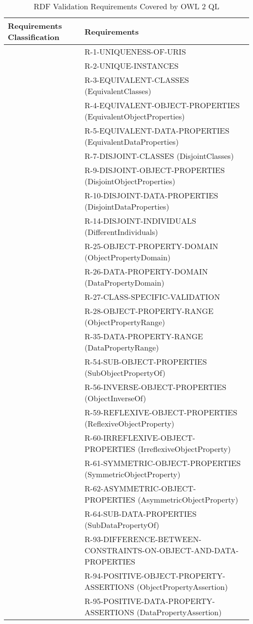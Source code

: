 \documentclass{llncs}
\newcommand{\hr}{\hline\noalign{\smallskip}} %
\begin{document}
\begin{table}
\caption{RDF Validation Requirements Covered by OWL 2 QL}
\label{tab:RequirementsCoveredOWL2QL}
\centering
\begin{tabular}{ll}
\hr
Requirements Classification & Requirements \\
\hr
& R-1-UNIQUENESS-OF-URIS \\
& R-2-UNIQUE-INSTANCES \\
& R-3-EQUIVALENT-CLASSES (EquivalentClasses) \\
& R-4-EQUIVALENT-OBJECT-PROPERTIES (EquivalentObjectProperties) \\
& R-5-EQUIVALENT-DATA-PROPERTIES (EquivalentDataProperties) \\
& R-7-DISJOINT-CLASSES (DisjointClasses) \\
& R-9-DISJOINT-OBJECT-PROPERTIES (DisjointObjectProperties) \\
& R-10-DISJOINT-DATA-PROPERTIES (DisjointDataProperties) \\
& R-14-DISJOINT-INDIVIDUALS (DifferentIndividuals) \\
& R-25-OBJECT-PROPERTY-DOMAIN (ObjectPropertyDomain) \\
& R-26-DATA-PROPERTY-DOMAIN (DataPropertyDomain) \\
& R-27-CLASS-SPECIFIC-VALIDATION \\
& R-28-OBJECT-PROPERTY-RANGE (ObjectPropertyRange) \\
& R-35-DATA-PROPERTY-RANGE (DataPropertyRange) \\
& R-54-SUB-OBJECT-PROPERTIES (SubObjectPropertyOf) \\
& R-56-INVERSE-OBJECT-PROPERTIES (ObjectInverseOf) \\
& R-59-REFLEXIVE-OBJECT-PROPERTIES (ReflexiveObjectProperty) \\
& R-60-IRREFLEXIVE-OBJECT-PROPERTIES (IrreflexiveObjectProperty) \\
& R-61-SYMMETRIC-OBJECT-PROPERTIES (SymmetricObjectProperty) \\
& R-62-ASYMMETRIC-OBJECT-PROPERTIES (AsymmetricObjectProperty) \\
& R-64-SUB-DATA-PROPERTIES (SubDataPropertyOf) \\
& R-93-DIFFERENCE-BETWEEN-CONSTRAINTS-ON-OBJECT-AND-DATA-PROPERTIES \\
& R-94-POSITIVE-OBJECT-PROPERTY-ASSERTIONS (ObjectPropertyAssertion) \\
& R-95-POSITIVE-DATA-PROPERTY-ASSERTIONS (DataPropertyAssertion) \\

\end{tabular}
\end{table}
\end{document}
